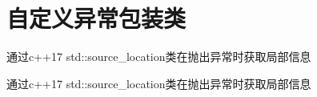 \chapter{自定义异常包装类}
\hypertarget{index}{}\label{index}
通过c++17 std\+::source\+\_\+location类在抛出异常时获取局部信息

通过c++17 std\+::source\+\_\+location类在抛出异常时获取局部信息 